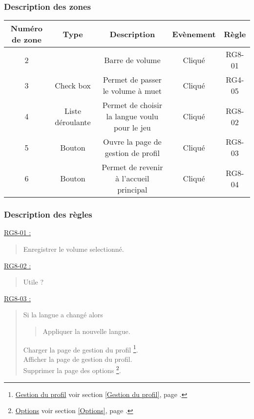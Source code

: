 \documentclass{report}
\begin{document}
		\subsubsection{Description des zones}
		
			\begin{tabular}{|c|c|c|c|c|} \hline
				Numéro de zone & Type  & Description & Evènement &	Règle \\\hline
				2 & & Barre de volume & Cliqué & RG8-01 \\\hline
				3 & Check box & Permet de passer le volume à muet & Cliqué & RG4-05 \\\hline
				4 & Liste déroulante & Permet de choisir la langue voulu pour le jeu & Cliqué & RG8-02 \\\hline
				5 & Bouton & Ouvre la page de gestion de profil & Cliqué & RG8-03 \\\hline
				6 & Bouton & Permet de revenir à l'accueil principal & Cliqué & RG8-04 \\\hline
			\end{tabular}
			
		\subsubsection{Description des règles}

			\underline{RG8-01 :}
				\begin{quote}
					Enregistrer le volume selectionné.\\
				\end{quote}


			\underline{RG8-02 :}
				\begin{quote}
					Utile ? \\
				\end{quote}


			\underline{RG8-03 :}
				\begin{quote}
					Si la langue a changé alors
					\begin{quote}
						Appliquer la nouvelle langue.
					\end{quote}
					Charger la page de gestion du profil%
						\footnote[1]{
							\hyperlink{Gestion du profil}{Gestion du profil}
							\og voir section \ref{Gestion du profil}, page \pageref{Gestion du profil}.\fg
						}.\\
					Afficher la page de gestion du profil\footnotemark[1].\\
					Supprimer la page des options%
						\footnote[2]{
							\hyperlink{Options}{Options}
							\og voir section \ref{Options}, page \pageref{Options}.\fg
						}.\\						
				\end{quote}
				
\end{document}
